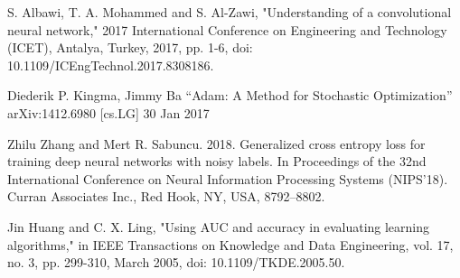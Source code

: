 \documentclass[conference]{IEEEtran}
\begin{document}
\begin{thebibliography}{00}
S. Albawi, T. A. Mohammed and S. Al-Zawi, "Understanding of a convolutional neural network," 2017 International Conference on Engineering and Technology (ICET), Antalya, Turkey, 2017, pp. 1-6, doi: 10.1109/ICEngTechnol.2017.8308186.

Diederik P. Kingma, Jimmy Ba “Adam: A Method for Stochastic Optimization” arXiv:1412.6980 [cs.LG] 30 Jan 2017

Zhilu Zhang and Mert R. Sabuncu. 2018. Generalized cross entropy loss for training deep neural networks with noisy labels. In Proceedings of the 32nd International Conference on Neural Information Processing Systems (NIPS'18). Curran Associates Inc., Red Hook, NY, USA, 8792–8802.

Jin Huang and C. X. Ling, "Using AUC and accuracy in evaluating learning algorithms," in IEEE Transactions on Knowledge and Data Engineering, vol. 17, no. 3, pp. 299-310, March 2005, doi: 10.1109/TKDE.2005.50.



\end{thebibliography}
\end{document}
